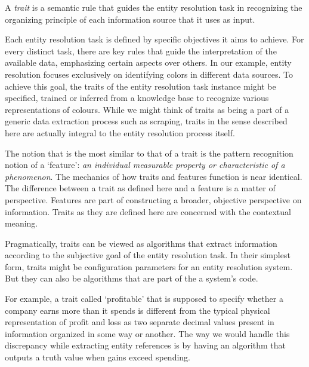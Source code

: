 \documentclass[journal]{IEEEtran}
\begin{document}
    \begin{defn}
        A \textit{trait} is a semantic rule that guides the entity resolution
        task in recognizing the organizing principle of each information source
        that it uses as input.
    \end{defn}

    Each entity resolution task is defined by specific objectives it aims to
    achieve.
    For every distinct task, there are key rules that guide the interpretation
    of the available data, emphasizing certain aspects over others.
    In our example, entity resolution focuses exclusively on identifying colors
    in different data sources.
    To achieve this goal, the traits of the entity resolution task instance
    might be specified, trained or inferred from a knowledge base to recognize
    various representations of colours.
    While we might think of traits as being a part of a generic data extraction
    process such as scraping, traits in the sense described here are actually
    integral to the entity resolution process itself.
    
    The notion that is the most similar to that of a trait is the pattern
    recognition notion of a `feature':
    \textit{an individual measurable property or characteristic of a
    phenomenon}\cite{bishop2006pattern}.
    The mechanics of how traits and features function is near identical.
    The difference between a trait as defined here and a feature is a matter of
    perspective.
    Features are part of constructing a broader, objective perspective on
    information.
    Traits as they are defined here are concerned with the contextual meaning.
    
    Pragmatically, traits can be viewed as algorithms that extract information
    according to the subjective goal of the entity resolution task.
    In their simplest form, traits might be configuration parameters for an
    entity resolution system.
    But they can also be algorithms that are part of the a system's code.

    For example, a trait called `profitable' that is supposed to specify whether
    a company earns more than it spends is different from the typical physical
    representation of profit and loss as two separate decimal values present
    in information organized in some way or another.
    The way we would handle this discrepancy while extracting entity references
    is by having an algorithm that outputs a truth value when gains exceed
    spending.
\end{document}
